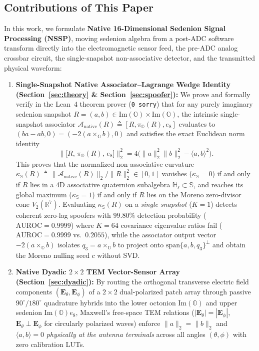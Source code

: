 \documentclass[journal,twoside]{IEEEtran}
\theoremstyle{definition}
\theoremstyle{remark}
\newcommand{\R}{\mathbb{R}}
\newcommand{\Ha}{\mathbb{H}}
\newcommand{\Oc}{\mathbb{O}}
\newcommand{\Se}{\mathbb{S}}
\newcommand{\ImPart}{\mathrm{Im}}
\newcommand{\Anative}{\mathcal{A}_{\mathrm{native}}}
\newcommand{\kappas}{\kappa_{\Se}}
\begin{document}
\subsection*{Contributions of This Paper}
In this work, we formulate \textbf{Native 16-Dimensional Sedenion Signal Processing (NSSP)}, moving sedenion algebra from a post-ADC software transform directly into the electromagnetic sensor feed, the pre-ADC analog crossbar circuit, the single-snapshot non-associative detector, and the transmitted physical waveform:
\begin{enumerate}
    \item \textbf{Single-Snapshot Native Associator--Lagrange Wedge Identity (Section~\ref{sec:theory} \& Section~\ref{sec:spoofer}):} We prove and formally verify in the Lean~4 theorem prover (\texttt{0 sorry}) that for any purely imaginary sedenion snapshot $R = (a, b) \in \ImPart(\Oc) \times \ImPart(\Oc)$, the intrinsic single-snapshot associator $\Anative(R) \triangleq [R, \pi_{\Oc}(R), e_8]$ evaluates to $(ba - ab, 0) = (-2(a\times_{\Oc} b), 0)$ and satisfies the exact Euclidean norm identity
    \begin{equation}
        \bigl\|\bigl[R,\, \pi_{\Oc}(R),\, e_8\bigr]\bigr\|_2^2 = 4\bigl(\|a\|_2^2 \|b\|_2^2 - \langle a, b \rangle^2\bigr).
        \label{eq:intro_lagrange}
    \end{equation}
    This proves that the normalized non-associative curvature $\kappas(R) \triangleq \|\Anative(R)\|_2 / \|R\|_2^2 \in [0, 1]$ vanishes ($\kappas=0$) if and only if $R$ lies in a 4D associative quaternion subalgebra $\Ha_\ell \subset \Se$, and reaches its global maximum ($\kappas=1$) if and only if $R$ lies on the Moreno zero-divisor cone $V_2(\R^7)$. Evaluating $\kappas(R)$ on a \emph{single snapshot} ($K=1$) detects coherent zero-lag spoofers with $99.80\%$ detection probability ($\mathrm{AUROC} = 0.9999$) where $K=64$ covariance eigenvalue ratios fail ($\mathrm{AUROC} = 0.9999$ vs.\ $0.2055$), while the associator output vector $-2(a\times_{\Oc} b)$ isolates $q_3 = a\times_{\Oc} b$ to project onto $\mathrm{span}\{a, b, q_3\}^\perp$ and obtain the Moreno nulling seed $c$ without SVD.
    \item \textbf{Native Dyadic $2\times 2$ TEM Vector-Sensor Array (Section~\ref{sec:dyadic}):} By routing the orthogonal transverse electric field components $(\bm{E}_\theta, \bm{E}_\phi)$ of a $2\times 2$ dual-polarized patch array through passive $90^\circ/180^\circ$ quadrature hybrids into the lower octonion $\ImPart(\Oc)$ and upper sedenion $\ImPart(\Oc)e_8$, Maxwell's free-space TEM relations ($|\bm{E}_\theta| = |\bm{E}_\phi|$, $\bm{E}_\theta \perp \bm{E}_\phi$ for circularly polarized waves) enforce $\|a\|_2 = \|b\|_2$ and $\langle a, b\rangle = 0$ \emph{physically at the antenna terminals} across all angles $(\theta, \phi)$ with zero calibration LUTs.

\end{enumerate}
\end{document}
